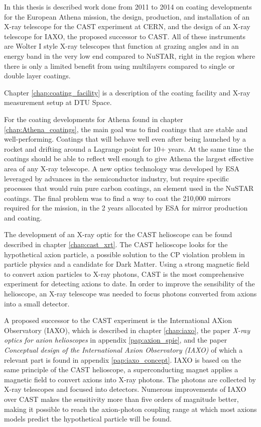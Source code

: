 In this thesis is described work done from 2011 to 2014 on coating developments for the European Athena mission, the design, production, and installation of an X-ray telescope for the CAST experiment at CERN, and the design of an X-ray telescope for IAXO, the proposed successor to CAST. All of these instruments are Wolter I style X-ray telescopes that function at grazing angles and in an energy band in the very low end compared to NuSTAR, right in the region where there is only a limited benefit from using multilayers compared to single or double layer coatings.

Chapter \ref{chap:coating_facility} is a description of the coating facility and X-ray measurement setup at DTU Space. %

For the coating developments for Athena found in chapter \ref{chap:Athena_coatings}, the main goal was to find coatings that are stable and well-performing. Coatings that will behave well even after being launched by a rocket and drifting around a Lagrange point for 10+ years. At the same time the coatings should be able to reflect well enough to give Athena the largest effective area of any X-ray telescope. A new optics technology was developed by ESA leveraged by advances in the semiconductor industry, but require specific processes that would ruin pure carbon coatings, an element used in the NuSTAR coatings. The final problem was to find a way to coat the 210,000 mirrors required for the mission, in the 2 years allocated by ESA for mirror production and coating.

The development of an X-ray optic for the CAST helioscope can be found described in chapter \ref{chap:cast_xrt}. The CAST helioscope looks for the hypothetical axion particle, a possible solution to the CP violation problem in particle physics and a candidate for Dark Matter. Using a strong magnetic field to convert axion particles to X-ray photons, CAST is the most comprehensive experiment for detecting axions to date. In order to improve the sensibility of the helioscope, an X-ray telescope was needed to focus photons converted from axions into a small detector.

A proposed successor to the CAST experiment is the International AXion Observatory (IAXO), which is described in chapter \ref{chap:iaxo}, the paper \emph{X-ray optics for axion helioscopes} in appendix \ref{pap:axion_spie}, and the paper \emph{Conceptual design of the International Axion Observatory (IAXO)} of which a relevant part is found in appendix \ref{pap:iaxo_concept}. IAXO is based on the same principle of the CAST helioscope, a superconducting magnet applies a magnetic field to convert axions into X-ray photons. The photons are collected by X-ray telescopes and focused into detectors. Numerous improvements of IAXO over CAST makes the sensitivity more than five orders of magnitude better, making it possible to reach the axion-photon coupling range at which most axions models predict the hypothetical particle will be found.

